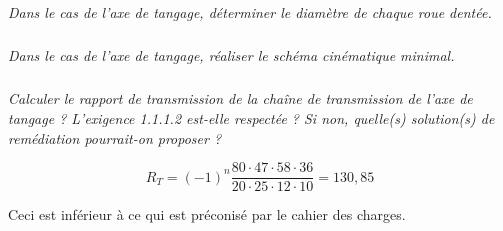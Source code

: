 \documentclass[10pt,fleqn]{article} %
\begin{document}
\begin{multicols}{2}
\begin{multicols}{2}
\subparagraph{}
\textit{Dans le cas de l'axe de tangage, déterminer le diamètre de chaque roue dentée.}
%
%
%
\subparagraph{}
\textit{Dans le cas de l'axe de tangage, réaliser le schéma cinématique minimal.}
\ifprof
\begin{corrige}
\end{corrige}
\else
\fi

\subparagraph{}
\textit{Calculer le rapport de transmission de la chaîne de transmission de l'axe de tangage ? L'exigence 1.1.1.2 est-elle respectée ? Si non, quelle(s) solution(s) de remédiation pourrait-on proposer ?}
\ifprof
\begin{corrige}
$$
R_T = (-1)^n \dfrac{80\cdot 47 \cdot 58 \cdot 36}{20\cdot 25\cdot 12 \cdot 10 } = 130,85
$$

Ceci est inférieur à ce qui est préconisé par le cahier des charges. 


\end{corrige}
\end{multicols}
\end{multicols}
\end{document}
